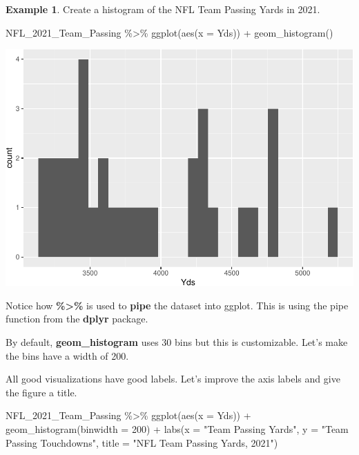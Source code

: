 \documentclass[
  11pt,
]{book}
\newenvironment{Shaded}{\begin{snugshade}}{\end{snugshade}}
\newcommand{\AttributeTok}[1]{\textcolor[rgb]{0.77,0.63,0.00}{#1}}
\newcommand{\DecValTok}[1]{\textcolor[rgb]{0.00,0.00,0.81}{#1}}
\newcommand{\FunctionTok}[1]{\textcolor[rgb]{0.00,0.00,0.00}{#1}}
\newcommand{\NormalTok}[1]{#1}
\newcommand{\SpecialCharTok}[1]{\textcolor[rgb]{0.00,0.00,0.00}{#1}}
\newcommand{\StringTok}[1]{\textcolor[rgb]{0.31,0.60,0.02}{#1}}
\theoremstyle{definition}
\theoremstyle{definition}
\newtheorem{example}{Example}[chapter]
\theoremstyle{definition}
\theoremstyle{definition}
\theoremstyle{remark}
\begin{document}
\begin{example}
Create a histogram of the NFL Team Passing Yards in 2021.

\begin{Shaded}
\begin{Highlighting}[]
\NormalTok{NFL\_2021\_Team\_Passing }\SpecialCharTok{\%\textgreater{}\%}
    \FunctionTok{ggplot}\NormalTok{(}\FunctionTok{aes}\NormalTok{(}\AttributeTok{x =}\NormalTok{ Yds)) }\SpecialCharTok{+} \FunctionTok{geom\_histogram}\NormalTok{()}
\end{Highlighting}
\end{Shaded}

\includegraphics{series_files/figure-latex/hist-1.pdf}

Notice how \textbf{\%\textgreater\%} is used to \textbf{pipe} the dataset into ggplot. This is using the pipe function from the \textbf{dplyr} package.

\vfill
\newpage

By default, \textbf{geom\_histogram} uses 30 bins but this is customizable. Let's make the bins have a width of 200.

All good visualizations have good labels. Let's improve the axis labels and give the figure a title.

\begin{Shaded}
\begin{Highlighting}[]
\NormalTok{NFL\_2021\_Team\_Passing }\SpecialCharTok{\%\textgreater{}\%}
    \FunctionTok{ggplot}\NormalTok{(}\FunctionTok{aes}\NormalTok{(}\AttributeTok{x =}\NormalTok{ Yds)) }\SpecialCharTok{+} \FunctionTok{geom\_histogram}\NormalTok{(}\AttributeTok{binwidth =} \DecValTok{200}\NormalTok{) }\SpecialCharTok{+} \FunctionTok{labs}\NormalTok{(}\AttributeTok{x =} \StringTok{"Team Passing Yards"}\NormalTok{,}
    \AttributeTok{y =} \StringTok{"Team Passing Touchdowns"}\NormalTok{, }\AttributeTok{title =} \StringTok{"NFL Team Passing Yards, 2021"}\NormalTok{)}
\end{Highlighting}
\end{Shaded}


\end{example}
\end{document}
